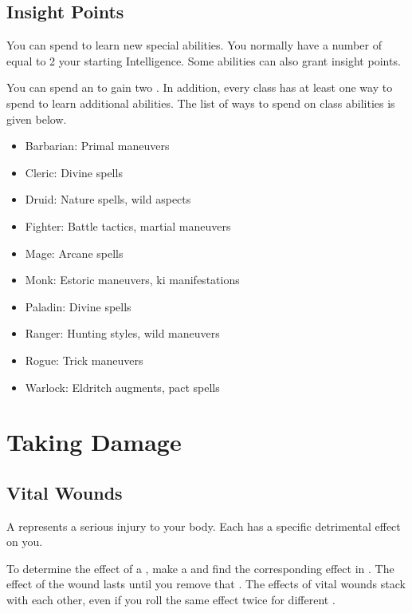     \subsection{Insight Points}\label{Insight Points}
        You can spend  to learn new special abilities.
        You normally have a number of  equal to 2 \add your starting Intelligence.
        Some abilities can also grant insight points.

        You can spend an  to gain two .
        In addition, every class has at least one way to spend  to learn additional abilities.
        The list of ways to spend  on class abilities is given below.
        \begin{itemize}
            \item Barbarian: Primal maneuvers
            \item Cleric: Divine spells
            \item Druid: Nature spells, wild aspects
            \item Fighter: Battle tactics, martial maneuvers
            \item Mage: Arcane spells
            \item Monk: Estoric maneuvers, ki manifestations
            \item Paladin: Divine spells
            \item Ranger: Hunting styles, wild maneuvers
            \item Rogue: Trick maneuvers
            \item Warlock: Eldritch augments, pact spells
        \end{itemize}

\section{Taking Damage}\label{Taking Damage}

    \subsection{Vital Wounds}\label{Vital Wounds}
        A  represents a serious injury to your body.
        Each  has a specific detrimental effect on you.

        To determine the effect of a , make a  and find the corresponding effect in .
        The effect of the wound lasts until you remove that .
        The effects of vital wounds stack with each other, even if you roll the same effect twice for different .

